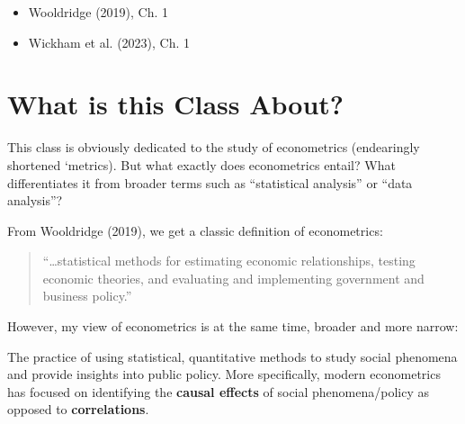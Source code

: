 \documentclass[
  letterpaper,
  DIV=11,
  numbers=noendperiod]{scrreprt}
\providecommand{\tightlist}{%
  \setlength{\itemsep}{0pt}\setlength{\parskip}{0pt}}
\begin{document}
\begin{tcolorbox}[enhanced jigsaw, arc=.35mm, bottomrule=.15mm, bottomtitle=1mm, breakable, colback=white, colbacktitle=quarto-callout-note-color!10!white, colframe=quarto-callout-note-color-frame, coltitle=black, left=2mm, leftrule=.75mm, opacityback=0, opacitybacktitle=0.6, rightrule=.15mm, title=\textcolor{quarto-callout-note-color}{\faInfo}\hspace{0.5em}{\textbf{Suggested Readings}}, titlerule=0mm, toprule=.15mm, toptitle=1mm]

\begin{itemize}
\tightlist
\item
  Wooldridge (2019), Ch. 1
\item
  Wickham et al. (2023), Ch. 1
\end{itemize}

\end{tcolorbox}

\section{What is this Class About?}\label{what-is-this-class-about}

This class is obviously dedicated to the study of econometrics
(endearingly shortened `metrics). But what exactly does econometrics
entail? What differentiates it from broader terms such as ``statistical
analysis'' or ``data analysis''?

From Wooldridge (2019), we get a classic definition of econometrics:

\begin{quote}
``\ldots statistical methods for estimating economic relationships,
testing economic theories, and evaluating and implementing government
and business policy.''
\end{quote}

However, my view of econometrics is at the same time, broader and more
narrow:

\begin{tcolorbox}[enhanced jigsaw, arc=.35mm, bottomrule=.15mm, bottomtitle=1mm, breakable, colback=white, colbacktitle=quarto-callout-note-color!10!white, colframe=quarto-callout-note-color-frame, coltitle=black, left=2mm, leftrule=.75mm, opacityback=0, opacitybacktitle=0.6, rightrule=.15mm, title=\textcolor{quarto-callout-note-color}{\faInfo}\hspace{0.5em}{Definition of Econometrics}, titlerule=0mm, toprule=.15mm, toptitle=1mm]

The practice of using statistical, quantitative methods to study social
phenomena and provide insights into public policy. More specifically,
modern econometrics has focused on identifying the \textbf{causal
effects} of social phenomena/policy as opposed to \textbf{correlations}.

\end{tcolorbox}
\end{document}
